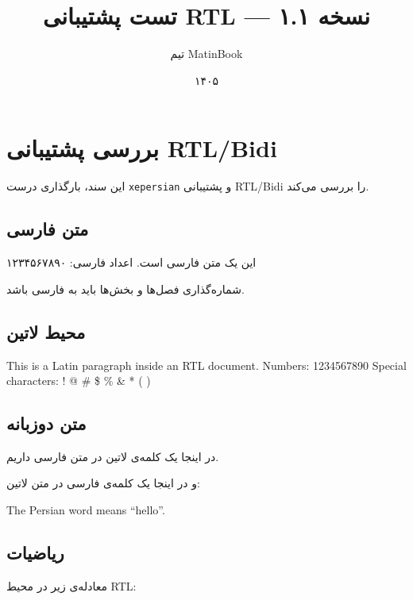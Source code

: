\documentclass{matinbook}
\title{تست پشتیبانی RTL — نسخه ۱.۱}
\author{تیم MatinBook}
\date{۱۴۰۵}
\begin{document}
\maketitle

\chapter{بررسی پشتیبانی RTL/Bidi}
\label{chap:test-rtl}

این سند، بارگذاری درست \texttt{xepersian} و پشتیبانی RTL/Bidi
را بررسی می‌کند.

\section{متن فارسی}
\label{sec:persian-text}

این یک متن فارسی است. اعداد فارسی: ۱۲۳۴۵۶۷۸۹۰

شماره‌گذاری فصل‌ها و بخش‌ها باید به فارسی باشد.

\section{محیط لاتین}
\label{sec:latin-env}

\begin{latin}
This is a Latin paragraph inside an RTL document.
Numbers: 1234567890
Special characters: ! @ \# \$ \% \& * ( )
\end{latin}

\section{متن دوزبانه}
\label{sec:bilingual}

در اینجا یک کلمه‌ی لاتین  در متن فارسی داریم.

و در اینجا یک کلمه‌ی فارسی در متن لاتین:

\begin{latin}
The Persian word  means ``hello''.
\end{latin}

\section{ریاضیات}
\label{sec:math}

معادله‌ی زیر در محیط RTL:
\end{document}
